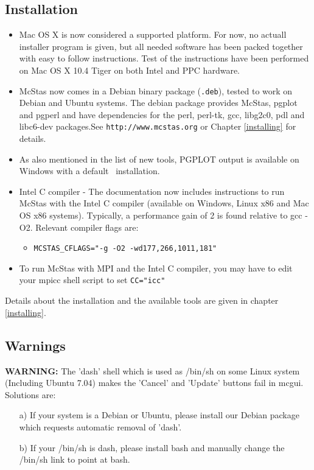 \subsection{Installation}
\begin{itemize} 
\item Mac OS X is now considered a supported platform. For now, no actuall installer program
  is given, but all needed software has been packed together with easy to follow instructions.
  Test of the instructions have been performed on Mac OS X 10.4 Tiger on both Intel and PPC
  hardware.
\item McStas now comes in a Debian binary package (\verb+.deb+), tested to work on Debian and Ubuntu systems. The debian
    package provides McStas, pgplot and pgperl and have dependencies for the perl, perl-tk, gcc, libg2c0, pdl and libc6-dev 
    packages.See \verb+http://www.mcstas.org+ or  Chapter \ref{installing} for details.
\item As also mentioned in the list of new tools, PGPLOT output is available on Windows with a default \MCS\ installation.
\item  Intel C compiler - The documentation now includes instructions to run McStas with the Intel C compiler (available on Windows,
    Linux x86 and Mac OS x86 systems). Typically, a performance gain of 2 is found relative to gcc -O2. Relevant
    compiler flags are:
    \begin{itemize}
      \item \verb+MCSTAS_CFLAGS="-g -O2 -wd177,266,1011,181"+
    \end{itemize}
\item To run McStas with MPI and the Intel C compiler, you may have to edit your mpicc shell script to set \verb+CC="icc"+
\end{itemize}
Details about the installation and the available tools are given in chapter \ref{installing}.

\subsection{Warnings}
{\bf WARNING:} The 'dash' shell which is used as /bin/sh on some Linux system (Including Ubuntu 7.04) makes the 'Cancel' and 'Update' 
buttons fail in mcgui. Solutions are:
\begin{itemize}
\item[a)] If your system is a Debian or Ubuntu, please install our Debian package which requests automatic removal of 'dash'.
\item[b)] If your /bin/sh is dash, please install bash and manually change the /bin/sh link to point at bash.
\end{itemize}

